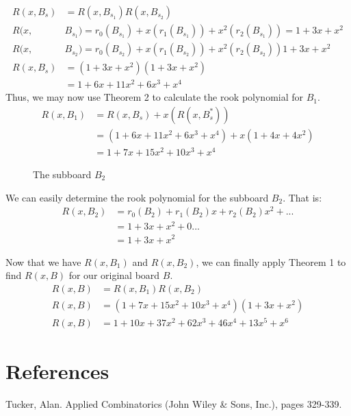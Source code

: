 \documentclass{article}
\newcommand{\w}{0.5}
\newcommand{\shadesquare}[2]{\filldraw[fill=gray!40!white, draw=black] (#1*\w - \w,#2*\w - \w) rectangle (#1*\w,#2*\w);}
\begin{document}
\begin{align*}
R(x,B_s) &= R(x,B_{s_1})R(x,B_{s_2}) \\
R(x, &B_{s_1}) = r_0(B_{s_1}) + x(r_1(B_{s_1})) + x^2(r_2(B_{s_1})) = 1 + 3x + x^2 \\
R(x, &B_{s_2}) = r_0(B_{s_2}) + x(r_1(B_{s_2})) + x^2(r_2(B_{s_2})) 1 + 3x + x^2 \\
R(x, B_s) &= (1 + 3x + x^2)(1 + 3x + x^2) \\
&= 1 + 6x + 11x^2 + 6x^3 + x^4
\end{align*}
Thus, we may now use Theorem 2 to calculate the rook polynomial for $B_1$.
\begin{align*}
    R(x,B_1) &= R(x, B_s) + x(R(x, B_{s}^*)) \\
    &= (1 + 6x + 11x^2 + 6x^3 + x^4) + x(1 + 4x + 4x^2) \\
    &= 1 + 7x + 15x^2 + 10x^3 + x^4
\end{align*}

\begin{figure}[!h]
    \centering
    \caption{The subboard $B_2$}
    \label{B2}
\end{figure}

We can easily determine the rook polynomial for the subboard $B_2$. That is: 
\begin{align*}
R(x, B_2) &= r_0(B_2) + r_1(B_2)x + r_2(B_2)x^2 + ... \\
&= 1 + 3x + x^2 + 0... \\
&= 1 + 3x + x^2
\end{align*}

Now that we have $R(x, B_1)$ and $R(x, B_2)$, we can finally apply Theorem 1 to find $R(x, B)$ for our original board $B$.
\begin{align*}
    R(x, B) &= R(x, B_1)R(x, B_2) \\
    R(x, B) &= (1 + 7x + 15x^2 + 10x^3 + x^4)(1 + 3x + x^2) \\
    R(x, B) &= 1 + 10x + 37x^2 + 62x^3 + 46x^4 + 13x^5 + x^6
\end{align*}

\section{References} \label{references}

Tucker, Alan. Applied Combinatorics (John Wiley \& Sons, Inc.), pages 329-339. 
\end{document}
